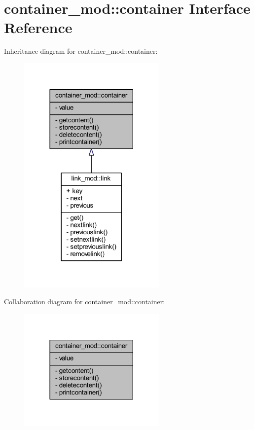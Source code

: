\hypertarget{structcontainer__mod_1_1container}{}\section{container\+\_\+mod\+:\+:container Interface Reference}
\label{structcontainer__mod_1_1container}


Inheritance diagram for container\+\_\+mod\+:\+:container\+:\nopagebreak
\begin{figure}[H]
\begin{center}
\leavevmode
\includegraphics[width=206pt]{structcontainer__mod_1_1container__inherit__graph}
\end{center}
\end{figure}


Collaboration diagram for container\+\_\+mod\+:\+:container\+:\nopagebreak
\begin{figure}[H]
\begin{center}
\leavevmode
\includegraphics[width=206pt]{structcontainer__mod_1_1container__coll__graph}
\end{center}
\end{figure}
